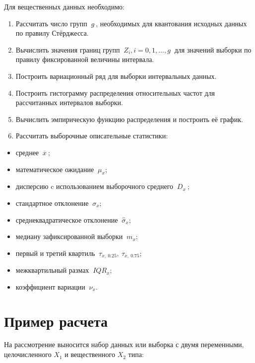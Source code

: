 \documentclass[
]{article}
\providecommand{\tightlist}{%
  \setlength{\itemsep}{0pt}\setlength{\parskip}{0pt}}
\begin{document}
Для вещественных данных необходимо:

\begin{enumerate}
\def\labelenumi{\arabic{enumi}.}
\item
  Рассчитать число групп \(\ g\ \), необходимых для квантования исходных
  данных по правилу Стёрджесса.
\item
  Вычислить значения границ групп \(\ Z_i, i=0, 1, \dots, g\ \) для
  значений выборки по правилу фиксированной величины интервала.
\item
  Построить вариационный ряд для выборки интервальных данных.
\item
  Построить гистограмму распределения относительных частот для
  рассчитанных интервалов выборки.
\item
  Вычислить эмпирическую функцию распределения и построить её график.
\item
  Рассчитать выборочные описательные статистики:
\end{enumerate}

\begin{itemize}
\tightlist
\item
  среднее \(\ \overline{x}\ \);
\item
  математическое ожидание \(\ \mu_x\);
\item
  дисперсию c использованием выборочного среднего \(\ D_{x}\ \);
\item
  стандартное отклонение \(\ \sigma_{x}\);
\item
  среднеквадратическое отклонение \(\ \hat{\sigma}_x\);
\item
  медиану зафиксированной выборки \(\ m_x\);
\item
  первый и третий квартиль \(\ \tau_{x,\ 0.25},\ \tau_{x,\ 0.75}\);
\item
  межквартильный размах \(\ IQR_x\);
\item
  коэффициент вариации \(\ \nu_{x}\).
\end{itemize}

\hypertarget{ux43fux440ux438ux43cux435ux440-ux440ux430ux441ux447ux435ux442ux430}{%
\section{\texorpdfstring{\textbf{Пример
расчета}}{Пример расчета}}\label{ux43fux440ux438ux43cux435ux440-ux440ux430ux441ux447ux435ux442ux430}}

На рассмотрение выносится набор данных или выборка с двумя переменными,
целочисленного \(X_1\) и вещественного \(X_2\) типа:
\end{document}
